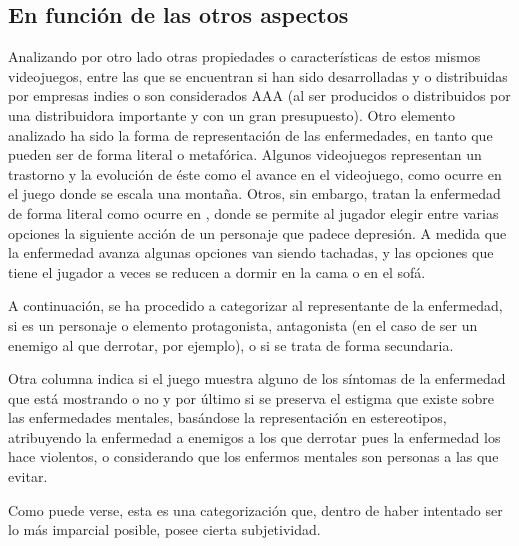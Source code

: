 \documentclass[12pt, a4paper,twoside,titlepage]{book}
\begin{document}
\subsection{En función de las otros aspectos} 
    



Analizando por otro lado otras propiedades o características de estos mismos videojuegos, entre las que se encuentran si han sido desarrolladas y o distribuidas por empresas indies o son considerados AAA (al ser producidos o distribuidos por una distribuidora importante y con un gran presupuesto). Otro elemento analizado ha sido la forma de representación de las enfermedades, en tanto que pueden ser de forma literal o metafórica. Algunos videojuegos representan un trastorno y la evolución de éste como el avance en el videojuego, como ocurre en el juego  donde se escala una montaña. Otros, sin embargo, tratan la enfermedad de forma literal como ocurre en , donde se permite al jugador elegir entre varias opciones la siguiente acción de un personaje que padece depresión. A medida que la enfermedad avanza algunas opciones van siendo tachadas, y las opciones que tiene el jugador a veces se reducen a dormir en la cama o en el sofá. 

A continuación, se ha procedido a categorizar al representante de la enfermedad, si es un personaje o elemento protagonista, antagonista (en el caso de ser un enemigo al que derrotar, por ejemplo), o si se trata de forma secundaria. 

Otra columna indica si el juego muestra alguno de los síntomas de la enfermedad que está mostrando o no y por último si se preserva el estigma que existe sobre las enfermedades mentales, basándose la representación en estereotipos, atribuyendo la enfermedad a enemigos a los que derrotar pues la enfermedad los hace violentos, o considerando que los enfermos mentales son personas a las que evitar. 

Como puede verse, esta es una categorización que, dentro de haber intentado ser lo más imparcial posible, posee cierta subjetividad. 





    
\end{document}
